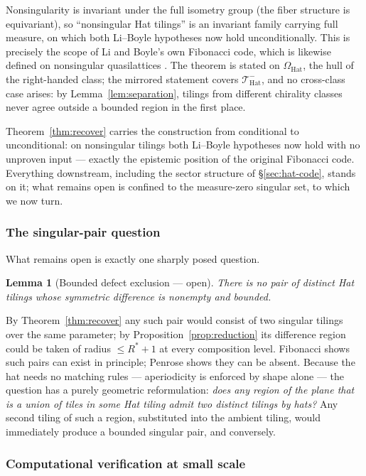 \documentclass[a4paper,unpublished]{quantumarticle}
\newtheorem{lemma}[theorem]{Lemma}
\theoremstyle{remark}
\newcommand{\THat}{\mathcal{T}_{\mathrm{Hat}}}
\newcommand{\OHat}{\Omega_{\mathrm{Hat}}}
\begin{document}
Nonsingularity is invariant under the full isometry group (the fiber
structure is equivariant), so ``nonsingular Hat tilings'' is an
invariant family carrying full measure, on which both Li--Boyle
hypotheses now hold unconditionally. This is precisely the scope of
Li and Boyle's own Fibonacci code, which is likewise defined on
nonsingular quasilattices \cite[App.~B.3]{LiBoyle2024}. The theorem
is stated on $\OHat$, the hull of the right-handed class; the
mirrored statement covers $\THat^{-}$, and no cross-class case
arises: by Lemma~\ref{lem:separation}, tilings from different
chirality classes never agree outside a bounded region in the first
place.

Theorem~\ref{thm:recover} carries the construction from conditional
to unconditional: on nonsingular tilings both Li--Boyle hypotheses
now hold with no unproven input --- exactly the epistemic position of
the original Fibonacci code. Everything downstream, including the
sector structure of \S\ref{sec:hat-code}, stands on it; what
remains open is confined to the measure-zero singular set, to which
we now turn.

\subsubsection{The singular-pair question}

What remains open is exactly one sharply posed question.

\begin{lemma}[Bounded defect exclusion --- open]
\label{lem:defect}
There is no pair of distinct Hat tilings whose symmetric difference
is nonempty and bounded.
\end{lemma}

By Theorem~\ref{thm:recover} any such pair would consist of two
singular tilings over the same parameter; by
Proposition~\ref{prop:reduction} its difference region could be taken
of radius $\leq R^{*} + 1$ at every composition level. Fibonacci
shows such pairs can exist in principle; Penrose shows they can be
absent. Because the hat needs no matching rules --- aperiodicity is
enforced by shape alone --- the question has a purely geometric
reformulation: \emph{does any region of the plane that is a union of
tiles in some Hat tiling admit two distinct tilings by hats?} Any
second tiling of such a region, substituted into the ambient tiling,
would immediately produce a bounded singular pair, and conversely.

\subsubsection{Computational verification at small scale}
\end{document}
